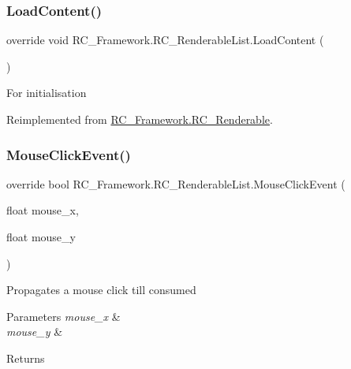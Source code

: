 \subsubsection{\texorpdfstring{Load\+Content()}{LoadContent()}}
{\footnotesize\ttfamily override void R\+C\+\_\+\+Framework.\+R\+C\+\_\+\+Renderable\+List.\+Load\+Content (\begin{DoxyParamCaption}{ }\end{DoxyParamCaption})\hspace{0.3cm}{\ttfamily [virtual]}}



For initialisation 



Reimplemented from \mbox{\hyperlink{class_r_c___framework_1_1_r_c___renderable_ae5283e88f2cc34c2ef010ede22ab1bfb}{R\+C\+\_\+\+Framework.\+R\+C\+\_\+\+Renderable}}.

\mbox{\label{class_r_c___framework_1_1_r_c___renderable_list_ac275d3df45899b62e1378e01a100268d}} 
\subsubsection{\texorpdfstring{Mouse\+Click\+Event()}{MouseClickEvent()}}
{\footnotesize\ttfamily override bool R\+C\+\_\+\+Framework.\+R\+C\+\_\+\+Renderable\+List.\+Mouse\+Click\+Event (\begin{DoxyParamCaption}\item[{float}]{mouse\+\_\+x,  }\item[{float}]{mouse\+\_\+y }\end{DoxyParamCaption})\hspace{0.3cm}{\ttfamily [virtual]}}



Propagates a mouse click till consumed 


\begin{DoxyParams}{Parameters}
{\em mouse\+\_\+x} & \\
\hline
{\em mouse\+\_\+y} & \\
\hline
\end{DoxyParams}
\begin{DoxyReturn}{Returns}

\end{DoxyReturn}


